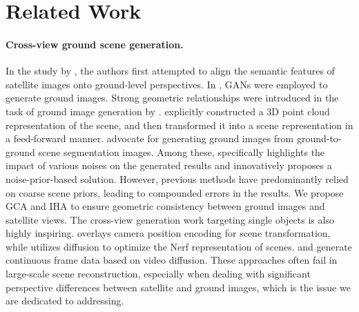 \section{Related Work}
\paragraph{Cross-view ground scene generation.} 
In the study by \cite{zhai2017predicting}, the authors first attempted to align the semantic features of satellite images onto ground-level perspectives. In \cite{wu2022cross}, GANs were employed to generate ground images. Strong geometric relationships were introduced in the task of ground image generation by \cite{lu2020geometry, shi2022geometry, qian2023sat2density}. \cite{li2021sat2vid, li2024sat2scene} explicitly constructed a 3D point cloud representation of the scene, and then transformed it into a scene representation in a feed-forward manner. \cite{gao2024scp, xu2024geospecific, li2024crossviewdiff} advocate for generating ground images from ground-to-ground scene segmentation images. Among these, \cite{gao2024scp} specifically highlights the impact of various noises on the generated results and innovatively proposes a noise-prior-based solution. However, previous methods have predominantly relied on coarse scene priors, leading to compounded errors in the results. We propose GCA and IHA to ensure geometric consistency between ground images and satellite views. 
The cross-view generation work targeting single objects is also highly inspiring. \cite{liu2023zero} overlays camera position encoding for scene transformation, while \cite{poole2022dreamfusion} utilizes diffusion to optimize the Nerf representation of scenes. \cite{melas20243d} and \cite{gao2024cat3d} generate continuous frame data based on video diffusion. These approaches often fail in large-scale scene reconstruction, especially when dealing with significant perspective differences between satellite and ground images, which is the issue we are dedicated to addressing.

